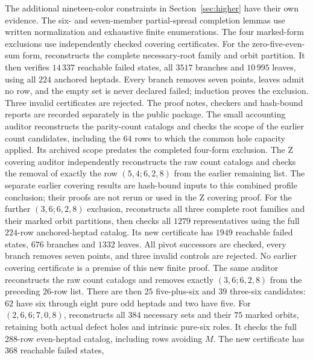 The additional nineteen-color constraints in Section~\ref{sec:higher}
have their own evidence. The six- and seven-member partial-spread
completion lemmas use written normalization and exhaustive finite
enumerations. The four marked-form exclusions use independently checked
covering certificates. For the zero-five-even-sum form,
reconstructs the complete necessary-root family and orbit partition.
It then verifies $14\,337$ reachable failed states, all $3517$ branches
and $10\,995$ leaves, using all $224$ anchored heptads. Every branch
removes seven points, leaves admit no row, and the empty set is never
declared failed; induction proves the exclusion. Three invalid
certificates are rejected. The proof notes, checkers and hash-bound reports
are recorded separately in the public package. The small accounting
auditor 
reconstructs the parity-count catalogs and checks the scope of the
earlier count candidates, including the $64$ rows to which the common
hole capacity applied. Its archived scope predates the completed
four-form exclusion. The Z covering auditor independently reconstructs
the raw count catalogs and checks the removal of exactly the row
$(5,4;6,2,8)$ from the earlier remaining list. The separate
earlier covering results are hash-bound inputs to this combined profile
conclusion; their proofs are not rerun or used in the Z covering proof.
For the further $(3,6;6,2,8)$ exclusion,
reconstructs all three complete root families and their marked
orbit partitions, then checks all $1279$ representatives using
the full $224$-row anchored-heptad catalog. Its new certificate
has $1949$ reachable failed states, $676$ branches and $1332$
leaves. All pivot successors are checked, every branch removes
seven points, and three invalid controls are rejected. No earlier
covering certificate is a premise of this new finite proof.
The same auditor reconstructs the raw count catalogs and removes
exactly $(3,6;6,2,8)$ from the preceding $26$-row list. There are
then $25$ five-plus-six and $39$ three-six candidates: $62$ have
six through eight pure odd heptads and two have five.
For $(2,6,6;7,0,8)$,
reconstructs all $384$ necessary sets and their $75$ marked orbits,
retaining both actual defect holes and intrinsic pure-six roles.
It checks the full $288$-row even-heptad catalog, including rows
avoiding $M$. The new certificate has $368$ reachable failed states,
